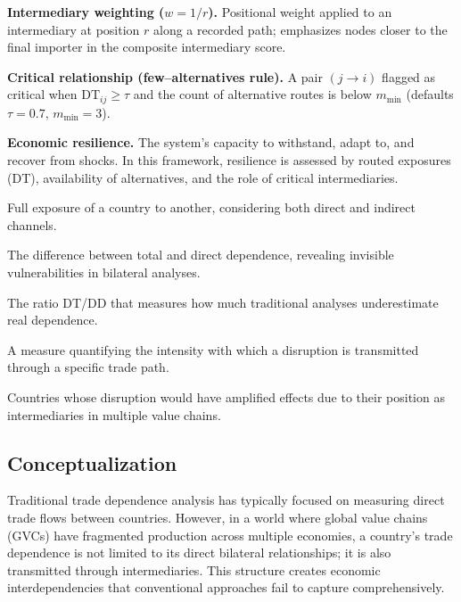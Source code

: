 \documentclass[final,1p,times,authoryear]{elsarticle}
\begin{document}
\textbf{Intermediary weighting ($w=1/r$).}
Positional weight applied to an intermediary at position $r$ along a recorded path; emphasizes nodes closer to the final importer in the composite intermediary score.

\textbf{Critical relationship (few--alternatives rule).}
A pair $(j\!\to\! i)$ flagged as critical when $\mathrm{DT}_{ij}\ge\tau$ and the count of alternative routes is below $m_{\min}$ (defaults $\tau=0.7$, $m_{\min}=3$).

\textbf{Economic resilience.}
The system’s capacity to withstand, adapt to, and recover from shocks. In this framework, resilience is assessed by routed exposures (DT), availability of alternatives, and the role of critical intermediaries.

\begin{tcolorbox}[title=Key Concepts of the Proposed Indicator, colback=blue!5!white, colframe=blue!75!black, fonttitle=\bfseries\footnotesize, boxsep=2pt, left=4pt, right=4pt, top=2pt, bottom=2pt]
\footnotesize
\begin{description}[leftmargin=0.5cm, itemsep=1pt, parsep=0pt]
\item[Total dependence (DT)] Full exposure of a country to another, considering both direct and indirect channels.
\item[Hidden dependence] The difference between total and direct dependence, revealing invisible vulnerabilities in bilateral analyses.
\item[Concealment ratio] The ratio DT/DD that measures how much traditional analyses underestimate real dependence.
\item[Path strength] A measure quantifying the intensity with which a disruption is transmitted through a specific trade path.
\item[Critical nodes] Countries whose disruption would have amplified effects due to their position as intermediaries in multiple value chains.
\end{description}
\end{tcolorbox}

\subsection{Conceptualization}

Traditional trade dependence analysis has typically focused on measuring direct trade flows between countries. However, in a world where global value chains (GVCs) have fragmented production across multiple economies, a country’s trade dependence is not limited to its direct bilateral relationships; it is also transmitted through intermediaries. This structure creates economic interdependencies that conventional approaches fail to capture comprehensively.
\end{document}
